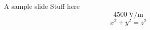 \documentclass[english,serif,professionalfont]{beamer} %
\begin{document}
\begin{frame}{A sample slide}
    Stuff here 
    \[\SI{4500}{\volt\per\meter}\]
    \[x^{2}+y^{2}=z^{2}\]
\end{frame}



%    
%    



\end{document}
